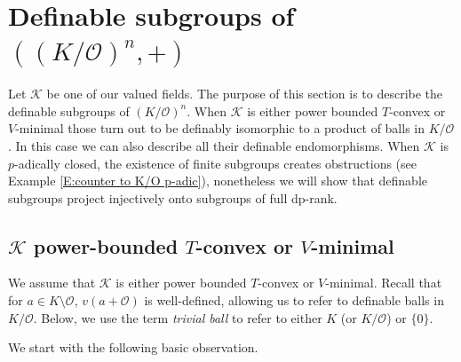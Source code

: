\documentclass[11pt]{amsart}
\theoremstyle{definition}
\newcommand{\CK}{{\mathcal K}}
\newcommand{\CO}{{\mathcal O}}
\newcommand{\0}{\emptyset}
\begin{document}
\section{Definable subgroups of $((K/\CO)^n,+)$}
Let $\CK$ be one of our valued fields. The purpose of this section is to describe the definable subgroups of $(K/\CO)^n$. When $\CK$ is either power bounded $T$-convex or $V$-minimal those turn out to be definably isomorphic to a product of balls in $K/\CO$. In this case we can also describe all their definable endomorphisms. When $\CK$ is $p$-adically closed, the existence  of finite subgroups creates obstructions (see Example \ref{E:counter to K/O p-adic}), nonetheless we will show that definable subgroups project injectively onto subgroups of full dp-rank.

\subsection{$\CK$ power-bounded $T$-convex or $V$-minimal}\label{ss:groups in K/O}
We assume that  $\CK$ is either power bounded $T$-convex or $V$-minimal. Recall that for $a\in K\setminus \CO$, $v(a+\CO)$ is well-defined, allowing us to refer to definable balls in $K/\CO$. Below, we use the term {\em trivial ball} to refer to either $K$ (or $K/\CO$) or $\{0\}$. 


We start with the following basic observation.
\end{document}
